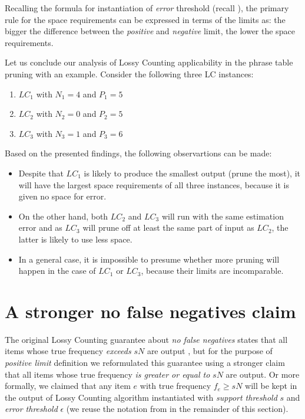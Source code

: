 Recalling the formula for instantiation of \emph{error} threshold (recall ),
the primary rule for the space requirements can be expressed in terms of the limits as:
the bigger the difference between the \emph{positive} and \emph{negative} limit,
the lower the space requirements.

Let us conclude our analysis of Lossy Counting applicability in the phrase table pruning with
an example. Consider the following three LC instances:
\begin{enumerate}
  \item $LC_{1}$ with $N_{1}=4$ and $P_{1}=5$
  \item $LC_{2}$ with $N_{2}=0$ and $P_{2}=5$
  \item $LC_{3}$ with $N_{3}=1$ and $P_{3}=6$
\end{enumerate}

Based on the presented findings, the following observartions can be made:
\begin{itemize}
  \item Despite that $LC_{1}$ is likely to produce the smallest output (prune the most),
    it will have the largest space requirements of all three instances, because it is given
    no space for error.
  \item On the other hand, both $LC_{2}$ and $LC_{3}$ will run with the same estimation error
    and as $LC_{3}$ will prune off at least the same part of input as $LC_{2}$, the latter is
    likely to use less space.
  \item In a general case, it is impossible to presume whether more pruning will happen
    in the case of $LC_{1}$ or $LC_{3}$, because their limits are incomparable.
\end{itemize}

\section{A stronger no false negatives claim}
\label{sec:positive-limit-validity}

The original Lossy Counting guarantee about \emph{no false negatives} states that all items
whose true frequency \emph{exceeds} $sN$ are output \citep[p. 3]{manku:lossycounting}, but
for the purpose of \emph{positive limit} definition we reformulated this guarantee using
a stronger claim that all items whose true frequency \emph{is greater or equal to} $sN$ are
output. Or more formally, we claimed that any item $e$ with true frequency $f_{e} \geq sN$
will be kept in the output of Lossy Counting algorithm instantiated with
\emph{support threshold} $s$ and \emph{error threshold} $\epsilon$
(we reuse the notation from  in the remainder of this section).


